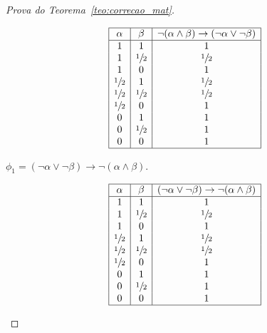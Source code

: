 \begin{proof}[Prova do Teorema~\ref{teo:correcao_mat}]
\begin{provaporcasos}
\begin{provaporsubcasos}
   
                \begin{center}
                    \[
                        \begin{array}{|c|c|c|}%
                            \hline
                            \alpha      & \beta & \neg(\alpha \land \beta) \to (\neg \alpha \lor \neg \beta) \\
                            \hline%
                            1 & 1 & 1\\
                            1 & \meio{} & \meio{}\\
                            1 & 0 & 1\\
                            \meio{} & 1 & \meio{}\\
                            \meio{} & \meio{} &\meio{}\\ 
                            \meio{} & 0 & 1\\
                            0 & 1 & 1\\
                            0 & \meio{} & 1\\
                            0 & 0 & 1\\
                            \hline
                        \end{array}
                    \]
                \end{center}
                
               

                \subcasodeprova{} $\phi_{1} = (\neg \alpha \lor \neg \beta) \to \neg (\alpha \land \beta)$. 
   
                \begin{center}
                    \[
                        \begin{array}{|c|c|c|}%
                            \hline
                            \alpha      & \beta & (\neg \alpha \lor \neg \beta) \to \neg (\alpha \land \beta) \\
                            \hline%
                            1 & 1 & 1\\
                            1 & \meio{} & \meio{}\\
                            1 & 0 & 1\\
                            \meio{} & 1 & \meio{}\\
                            \meio{} & \meio{} &\meio{}\\ 
                            \meio{} & 0 & 1\\
                            0 & 1 & 1\\
                            0 & \meio{} & 1\\
                            0 & 0 & 1\\
                            \hline
                        \end{array}
                    \]
                \end{center}


\end{provaporsubcasos}
\end{provaporcasos}
\end{proof}
